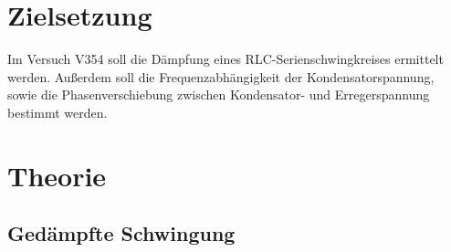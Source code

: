 \section{Zielsetzung}
\label{sec:Zielsetzung}

Im Versuch V354 soll die Dämpfung eines RLC-Serienschwingkreises ermittelt werden. 
Außerdem soll die Frequenzabhängigkeit der Kondensatorspannung, sowie die Phasenverschiebung zwischen Kondensator- und Erregerspannung bestimmt werden.

\section{Theorie}
\label{sec:Theorie}

\subsection{Gedämpfte Schwingung}
\label{sec:Gedaempfte_Schwingung}

